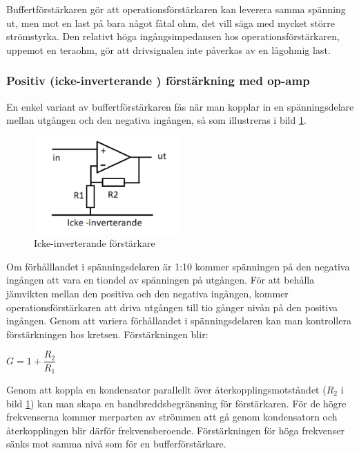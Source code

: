 Buffertförstärkaren gör att operationsförstärkaren kan leverera samma spänning ut, men mot en
last på bara något fåtal ohm, det vill säga med mycket större strömstyrka.
Den relativt höga ingångsimpedansen hos operationsförstärkaren, uppemot en teraohm, gör att drivsignalen inte påverkas av en lågohmig last.

\subsubsection{Positiv (icke-inverterande ) förstärkning med op-amp}
\label{icke-inverterande förstärkning}

En enkel variant av buffertförstärkaren fås när man kopplar in en spänningsdelare
mellan utgången och den negativa ingången, så som illustreras i bild
\ref{fig:BildII2-46}.

\begin{figure}
	\includegraphics[width=0.5\textwidth]{images/cropped_pdfs/bild_2_2-46.pdf}
	\caption{Icke-inverterande förstärkare}
	\label{fig:BildII2-46}
\end{figure}

Om förhålllandet i spänningsdelaren är 1:10 kommer spänningen på den negativa ingången att vara en tiondel av spänningen på utgången. För att behålla jämvikten mellan den positiva och den negativa ingången, kommer operationsförstärkaren att driva utgången till tio gånger nivån på den positiva ingången.
Genom att variera förhållandet i spänningsdelaren kan man kontrollera förstärkningen hos kretsen.
Förstärkningen blir:

\(G = 1+ \dfrac{R_2}{R_1}\)

Genom att koppla en kondensator parallellt över återkopplingsmotståndet (\(R_2\) i bild \ref{fig:BildII2-46}) kan man skapa en bandbreddsbegränsning för förstärkaren.
För de högre frekvenserna kommer merparten av strömmen att gå genom kondensatorn och återkopplingen blir därför frekvensberoende.
Förstärkningen för höga frekvenser sänks mot samma nivå som för en bufferförstärkare.

